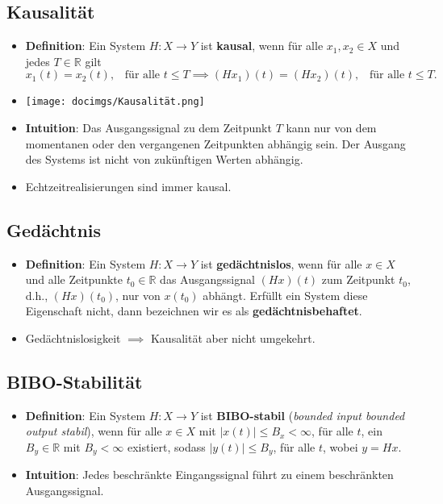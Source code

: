 \documentclass[11pt]{article}
\begin{document}
\subsection*{Kausalität}
\vspace*{-0.5cm}
\begin{itemize}[leftmargin=0pt]
    \item[] \textbf{Definition}: Ein System $H:X \to Y$ ist \textbf{kausal}, wenn für alle $x_1, x_2 \in X$ und jedes $T\in \mathbb{R}$ gilt
    $$x_1(t) = x_2(t), \hspace{10pt} \text{für alle } t \leq T \implies (Hx_1)(t) = (Hx_2)(t), \hspace{10pt} \text{für alle } t \leq T.$$
    \item[] \begin{center}
        \vspace*{-0.5cm}
        \texttt{[image: docimgs/Kausalität.png]}
    \end{center}
    \item[] \textbf{Intuition}: Das Ausgangssignal zu dem Zeitpunkt $T$ kann nur von dem momentanen oder den vergangenen Zeitpunkten abhängig sein. Der Ausgang des Systems ist nicht von zukünftigen Werten abhängig.
    \item[] Echtzeitrealisierungen sind immer kausal.
\end{itemize}

\subsection*{Gedächtnis}
\vspace*{-0.5cm}
\begin{itemize}[leftmargin=0pt]
    \item[] \textbf{Definition}: Ein System $H:X \to Y$ ist \textbf{gedächtnislos}, wenn für alle $x\in X$ und alle Zeitpunkte $t_0 \in \mathbb{R}$ das Ausgangssignal $(Hx)(t)$ zum Zeitpunkt $t_0$, d.h., $(Hx)(t_0)$, nur von $x(t_0)$ abhängt. Erfüllt ein System diese Eigenschaft nicht, dann bezeichnen wir es als \textbf{gedächtnisbehaftet}.
    \item[] Gedächtnislosigkeit $\implies$ Kausalität aber nicht umgekehrt.
\end{itemize}

\vfill \null
\pagebreak

\subsection*{BIBO-Stabilität}
\vspace*{-0.5cm}
\begin{itemize}[leftmargin=0pt]
    \item[] \textbf{Definition}: Ein System $H:X\to Y$ ist \textbf{BIBO-stabil} (\textit{bounded input bounded output stabil}), wenn für alle $x\in X$ mit $|x(t)| \leq B_x < \infty$, für alle $t$, ein $B_y \in \mathbb{R}$ mit $B_y < \infty$ existiert, sodass $|y(t)| \leq B_y$, für alle $t$, wobei $y=Hx$.
    \item[] \textbf{Intuition}: Jedes beschränkte Eingangssignal führt zu einem beschränkten Ausgangssignal. 
\end{itemize}
\end{document}
